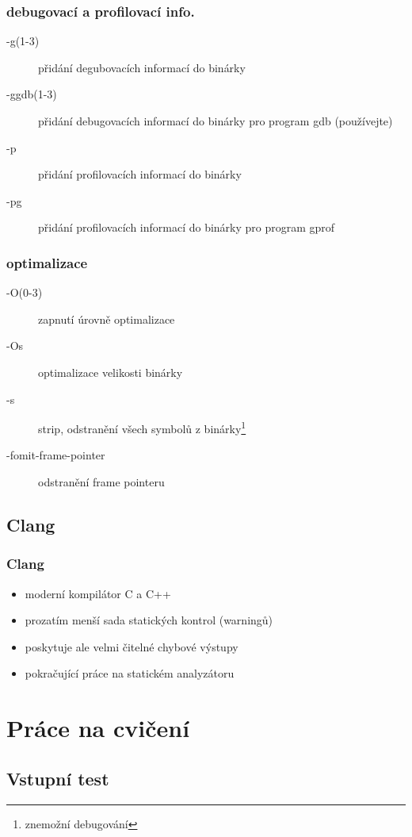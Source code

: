 	\begin{frame}
		\frametitle{debugovací a profilovací info.}
		\begin{description}
			\item[-g(1-3)]{přidání degubovacích informací do binárky}
			\item[-ggdb(1-3)]{přidání debugovacích informací do binárky pro program gdb (používejte)}
			\item[-p]{přidání profilovacích informací do binárky}
			\item[-pg]{přidání profilovacích informací do binárky pro program gprof}
		\end{description}
	\end{frame}

	\begin{frame}
		\frametitle{optimalizace}
		\begin{description}
			\item[-O(0-3)]{zapnutí úrovně optimalizace}
			\item[-Os]{optimalizace velikosti binárky}
			\item[-s]{strip, odstranění všech symbolů z binárky\footnote[1]{\alert{znemožní debugování}}}
			\item[-fomit-frame-pointer]{odstranění frame pointeru\footnotemark[1]}
		\end{description}
	\end{frame}

	\subsection{Clang}

	\begin{frame}
		\frametitle{Clang}
		\begin{itemize}
			\item{moderní kompilátor C a C++}
			\item{prozatím menší sada statických kontrol (warningů)}
			\item{poskytuje ale velmi čitelné chybové výstupy}
			\item{pokračující práce na statickém analyzátoru}
	\end{itemize}
\end{frame}

\section{Práce na cvičení}
\subsection{Vstupní test}

